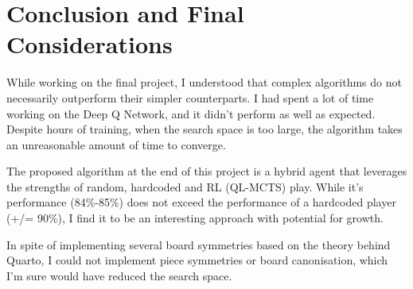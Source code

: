\documentclass[12pt]{article}
\begin{document}






\section{Conclusion and Final Considerations}

While working on the final project, I understood that complex algorithms do not necessarily outperform their simpler counterparts. I had spent a lot of time working on the Deep Q Network, and it didn't perform as well as expected. Despite hours of training, when the search space is too large, the algorithm takes an unreasonable amount of time to converge.

The proposed algorithm at the end of this project is a hybrid agent that leverages the strengths of random, hardcoded and RL (QL-MCTS) play. While it's performance (84\%-85\%) does not exceed the performance of a hardcoded player (+/= 90\%), I find it to be an interesting approach with potential for growth.

In spite of implementing several board symmetries based on the theory behind Quarto, I could not implement piece symmetries or board canonisation, which I'm sure would have reduced the search space.





\newpage
% 
\end{document}
